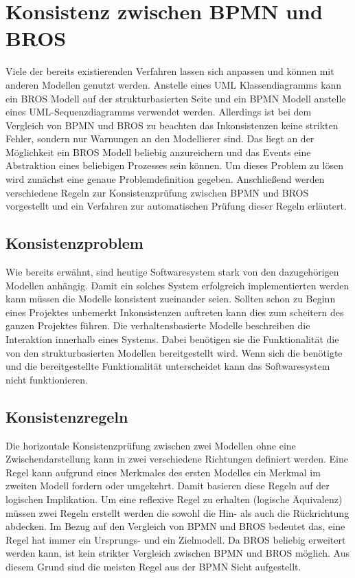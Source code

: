 \chapter{Konsistenz zwischen BPMN und BROS}

Viele der bereits existierenden Verfahren lassen sich anpassen und können mit anderen Modellen genutzt werden. 
Anstelle eines UML Klassendiagramms kann ein BROS Modell auf der strukturbasierten Seite und ein BPMN Modell anstelle eines UML-Sequenzdiagramms verwendet werden.
Allerdings ist bei dem Vergleich von BPMN und BROS zu beachten das Inkonsistenzen keine strikten Fehler, sondern nur Warnungen an den Modellierer sind.
Das liegt an der Möglichkeit ein BROS Modell beliebig anzureichern und das Events eine Abstraktion eines beliebigen Prozesses sein können.
Um dieses Problem zu lösen wird zunächst eine genaue Problemdefinition gegeben.
Anschließend werden verschiedene Regeln zur Konsistenzprüfung zwischen BPMN und BROS vorgestellt und ein Verfahren zur automatischen Prüfung dieser Regeln erläutert.

\section{Konsistenzproblem}

Wie bereits erwähnt, sind heutige Softwaresystem stark von den dazugehörigen Modellen anhängig.
Damit ein solches System erfolgreich implementierten werden kann müssen die Modelle konsistent zueinander seien.
Sollten schon zu Beginn eines Projektes unbemerkt Inkonsistenzen auftreten kann dies zum scheitern des ganzen Projektes führen.
Die verhaltensbasierte Modelle beschreiben die Interaktion innerhalb eines Systems.
Dabei benötigen sie die Funktionalität die von den strukturbasierten Modellen bereitgestellt wird.
Wenn sich die benötigte und die bereitgestellte Funktionalität unterscheidet kann das Softwaresystem nicht funktionieren.

\section{Konsistenzregeln} \label{sec:Konsistenzregeln}

Die horizontale Konsistenzprüfung zwischen zwei Modellen ohne eine Zwischendarstellung kann in zwei verschiedene Richtungen definiert werden.
Eine Regel kann aufgrund eines Merkmales des ersten Modelles ein Merkmal im zweiten Modell fordern oder umgekehrt.
Damit basieren diese Regeln auf der logischen Implikation.
Um eine reflexive Regel zu erhalten (logische Äquivalenz) müssen zwei Regeln erstellt werden die sowohl die Hin- als auch die Rückrichtung abdecken.
Im Bezug auf den Vergleich von BPMN und BROS bedeutet das, eine Regel hat immer ein Ursprungs- und ein Zielmodell.
Da BROS beliebig erweitert werden kann, ist kein strikter Vergleich zwischen BPMN und BROS möglich.
Aus diesem Grund sind die meisten Regel aus der BPMN Sicht aufgestellt.

